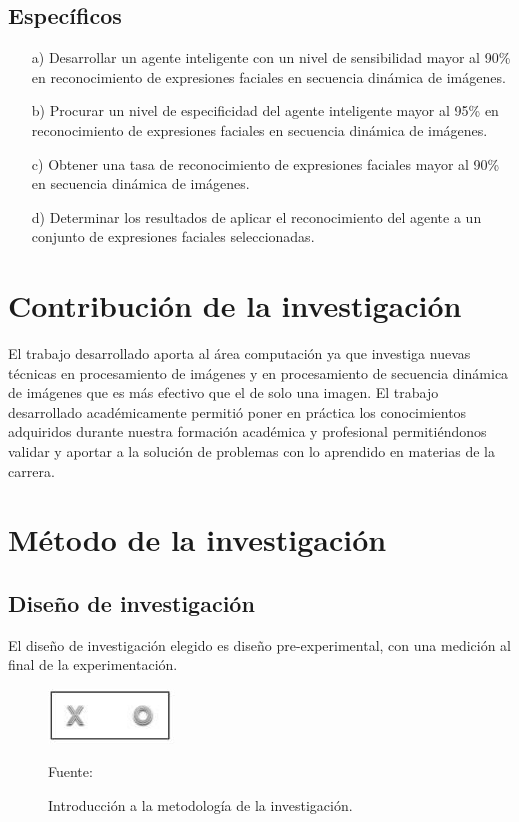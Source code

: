 \subsection{Específicos}
\begin{enumerate}
\item[a)] Desarrollar un agente inteligente con un nivel de sensibilidad mayor al 90\% en reconocimiento de expresiones faciales en secuencia dinámica de imágenes.

\item[b)] Procurar  un nivel de especificidad del agente inteligente mayor al 95\% en reconocimiento de expresiones faciales en secuencia dinámica de imágenes.

\item[c)] Obtener una tasa de reconocimiento de expresiones faciales mayor al 90\% en secuencia dinámica de imágenes.

\item[d)] Determinar los resultados de aplicar el reconocimiento del agente a un conjunto de expresiones faciales seleccionadas.
\end{enumerate}

\section{Contribución de la investigación}

El trabajo desarrollado aporta al área computación ya que investiga nuevas técnicas en procesamiento de imágenes y en procesamiento de secuencia dinámica de imágenes que es más efectivo que el de solo una imagen. 
\vskip 0.3cm
El trabajo desarrollado académicamente permitió poner en práctica los conocimientos adquiridos durante nuestra formación académica y profesional permitiéndonos validar y aportar a la solución de problemas con lo aprendido en materias de la carrera.

\section{Método de la investigación}

\subsection{Diseño de investigación}
El diseño de investigación elegido es diseño pre-experimental, con una medición al final de la experimentación.

\begin{figure}[ht]
\begin{center}
\includegraphics[width=0.3\textwidth]{Imagen1}
\end{center}
\begin{center}
\vskip -0.5cm
\caption{\small{Introducción a la metodología de la investigación.}}
{\small{Fuente: \cite{FALTA}}}
\end{center}
\end{figure}

